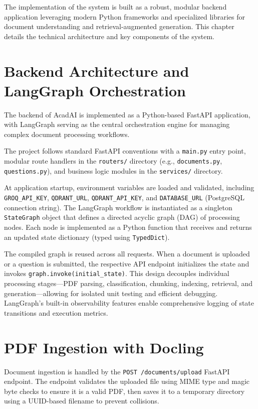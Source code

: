 \documentclass[12pt,a4paper]{report}
\begin{document}
The implementation of the system is built as a robust, modular backend application leveraging modern Python frameworks and specialized libraries for document understanding and retrieval-augmented generation. This chapter details the technical architecture and key components of the system.

\section{Backend Architecture and LangGraph Orchestration}

The backend of AcadAI is implemented as a Python-based FastAPI application, with LangGraph serving as the central orchestration engine for managing complex document processing workflows.

The project follows standard FastAPI conventions with a \texttt{main.py} entry point, modular route handlers in the \texttt{routers/} directory (e.g., \texttt{documents.py}, \texttt{questions.py}), and business logic modules in the \texttt{services/} directory.

At application startup, environment variables are loaded and validated, including \texttt{GROQ\_API\_KEY}, \texttt{QDRANT\_URL}, \texttt{QDRANT\_API\_KEY}, and \texttt{DATABASE\_URL} (PostgreSQL connection string). The LangGraph workflow is instantiated as a singleton \texttt{StateGraph} object that defines a directed acyclic graph (DAG) of processing nodes. Each node is implemented as a Python function that receives and returns an updated state dictionary (typed using \texttt{TypedDict}).

The compiled graph is reused across all requests. When a document is uploaded or a question is submitted, the respective API endpoint initializes the state and invokes \texttt{graph.invoke(initial\_state)}. This design decouples individual processing stages—PDF parsing, classification, chunking, indexing, retrieval, and generation—allowing for isolated unit testing and efficient debugging. LangGraph’s built-in observability features enable comprehensive logging of state transitions and execution metrics.

\section{PDF Ingestion with Docling}

Document ingestion is handled by the \texttt{POST /documents/upload} FastAPI endpoint. The endpoint validates the uploaded file using MIME type and magic byte checks to ensure it is a valid PDF, then saves it to a temporary directory using a UUID-based filename to prevent collisions.
\end{document}
